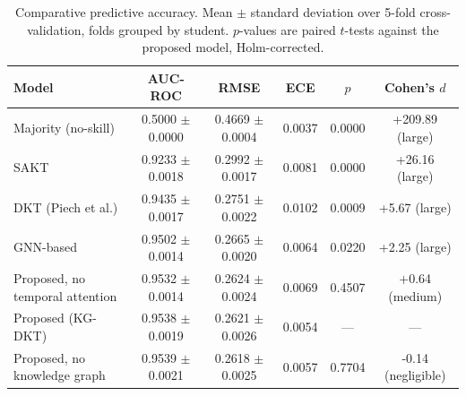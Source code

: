 \begin{table}[t]
\centering
\caption{Comparative predictive accuracy. Mean $\pm$ standard deviation over 5-fold cross-validation, folds grouped by student. $p$-values are paired $t$-tests against the proposed model, Holm-corrected.}
\label{tab:accuracy}
\begin{tabular}{lccccc}
\hline
Model & AUC-ROC & RMSE & ECE & $p$ & Cohen's $d$ \\
\hline
Majority (no-skill) & 0.5000 $\pm$ 0.0000 & 0.4669 $\pm$ 0.0004 & 0.0037 & 0.0000 & +209.89 (large) \\
SAKT & 0.9233 $\pm$ 0.0018 & 0.2992 $\pm$ 0.0017 & 0.0081 & 0.0000 & +26.16 (large) \\
DKT (Piech et al.) & 0.9435 $\pm$ 0.0017 & 0.2751 $\pm$ 0.0022 & 0.0102 & 0.0009 & +5.67 (large) \\
GNN-based & 0.9502 $\pm$ 0.0014 & 0.2665 $\pm$ 0.0020 & 0.0064 & 0.0220 & +2.25 (large) \\
Proposed, no temporal attention & 0.9532 $\pm$ 0.0014 & 0.2624 $\pm$ 0.0024 & 0.0069 & 0.4507 & +0.64 (medium) \\
Proposed (KG-DKT) & 0.9538 $\pm$ 0.0019 & 0.2621 $\pm$ 0.0026 & 0.0054 & — & — \\
Proposed, no knowledge graph & 0.9539 $\pm$ 0.0021 & 0.2618 $\pm$ 0.0025 & 0.0057 & 0.7704 & -0.14 (negligible) \\
\hline
\end{tabular}
\end{table}